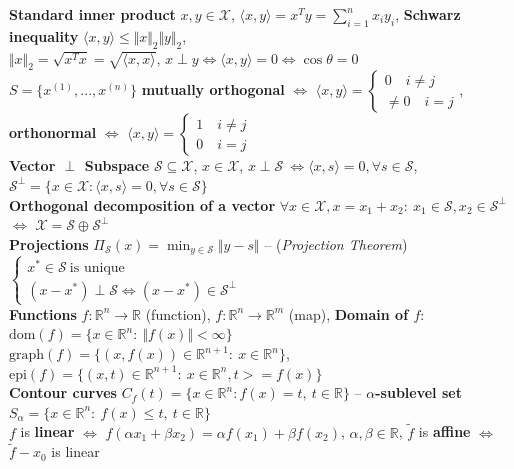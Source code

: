 \documentclass[a4paper]{article}
\begin{document}
\textbf{Standard inner product} $x, y \in \mathcal{X}$, $\langle x, y \rangle = x^T{y}=\sum_{i=1}^n{x_i y_i}$, \textbf{Schwarz inequality} $\langle x, y \rangle \le \Vert{x}\Vert_2 \Vert{y}\Vert_2$,\\
 $\Vert x \Vert_2 = \sqrt{x^T x} = \sqrt{\langle x,x \rangle}$, $x \perp y \iff \langle x,y \rangle=0 \iff \cos\theta=0$\\
 $S=\{x^{(1)}, ..., x^{(n)}\}$ \textbf{mutually orthogonal} $\iff$ $\langle{x,y}\rangle = \begin{cases}
    0 \quad i{\ne}j\\
    \ne 0 \quad i= j
 \end{cases}$, \textbf{orthonormal} $\iff$ $\langle{x,y}\rangle = \begin{cases}
    1 \quad i{\ne}j\\
     0 \quad i= j
 \end{cases}$\\
\textbf{Vector $\perp$ Subspace} $\mathcal{S}\subseteq\mathcal{X}$, $x\in\mathcal{X}$, $x\perp\mathcal{S} \ \iff \langle{x,s}\rangle=0, \forall{s}\in\mathcal{S}$, $\mathcal{S}^{\perp}=\{x\in\mathcal{X}: \langle{x,s}\rangle=0, \forall{s}\in\mathcal{S}\}$\\
 \textbf{Orthogonal decomposition of a vector} $\forall{x}\in\mathcal{X}, x=x_1+x_2: \ x_1 \in \mathcal{S}, x_2 \in \mathcal{S}^{\perp}$ $\iff$ $\mathcal{X} = \mathcal{S} \oplus \mathcal{S}^{\perp}$\\
\textbf{Projections} $\Pi_{\mathcal{S}}(x)=\min_{y\in\mathcal{S}} \Vert y-s \Vert$ -- (\textit{Projection Theorem})
$
\begin{cases}
    x^*\in\mathcal{S} \ \text{is unique} \\
    (x-x^*) \perp \mathcal{S} \iff (x-x^*) \in \mathcal{S}^{\perp}
\end{cases}
$\\
\textbf{Functions}  $f:\mathbb{R}^n \to \mathbb{R}$ (function), $f: \mathbb{R}^n \to \mathbb{R}^m$ (map), \textbf{Domain of $f$}: $\text{dom}(f)=\{x\in\mathbb{R}^n: \ \Vert f(x) \Vert < \infty \}$\\
$\text{graph}(f)=\{(x,f(x))\in\mathbb{R}^{n+1}: \ x\in \mathbb{R}^n\}$, $\text{epi}(f)=\{(x,t)\in\mathbb{R}^{n+1}: \ x\in\mathbb{R}^n,t>=f(x)\}$\\
\textbf{Contour curves} $C_f(t)=\{x\in \mathbb{R}^n: f(x)=t, \  t\in\mathbb{R}\}$ -- \textbf{$\alpha$-sublevel set} $S_{\alpha}=\{x\in\mathbb{R}^n: \ f(x)\le t, \ t\in \mathbb{R}\}$       \\
$f$ is \textbf{linear} $\iff$ $f(\alpha x_1 + \beta x_2) = \alpha f(x_1) + \beta f(x_2)$, $\alpha, \beta \in \mathbb{R}$, $\tilde{f}$ is \textbf{affine} $\iff$ $\tilde{f}-x_0$ is linear\\
\end{document}
